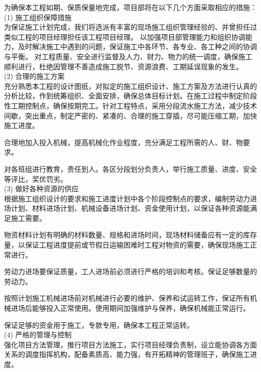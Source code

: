 为确保本工程如期、保质保量地完成，项目部将在以下几个方面采取相应的措施：\\

(1) 施工组织保障措施\\

为保证施工计划完成，我们将选派有丰富的现场施工组织管理经验的、并曾担任过类似工程的项目经理担任该工程项目经理。
以加强项目部管理能力和组织协调能力，及时解决施工中遇到的问题，保证施工中各环节、各专业、各工种之间的协调与平衡。
对工程质量、安全进行监督及人力、财力、物力的统一调度，确保施工顺利进行，杜绝因管理不善造成施工脱节、资源浪费、工期延误现象的发生。\\

(2) 合理的施工方案\\

 充分熟悉本工程的设计图纸，对拟定的施工组织设计、施工方案及方法进行认真的分析比较，作到统筹组织、全面安排，确保总体目标计划。在施工过程中制定阶段性工期控制点，确保按期完工。针对工程特点，采用分段流水施工方法，减少技术间歇，突出重点，制定严密的、紧凑的、合理的施工穿插，尽可能压缩工期，加快施工进度。

 合理地加入投入机械，提高机械化作业程度，充分满足工程所需的人、财、物要求。

 对各班组进行教育，责任到人。各区分段划分负责人，举行施工质量、进度、安全等评比，奖优罚劣。\\

(3) 做好各种资源的供应\\

 根据施工组织设计的要求和施工进度计划中各个阶段控制点的要求，编制劳动力进场计划、材料进场计划、机械设备进场计划、资金使用计划，以保证各种资源能满足施工需要。

 物资材料计划有明确的材料数量、规格和进场时间，现场材料储备应有一定的库存量，以保证工程进度提前或节假日运输困难时工程对物资的需要，确保现场施工正常进行。

 劳动力进场要保证质量，工人进场前必须进行严格的培训和考核。保证足够数量的劳动力。

 按照计划施工机械进场前对机械进行必要的维护、保养和试运转工作，保证所有机械进场后能够投入正常使用。使用期间加强维护与保养，确保机械能正常运行。

 保证足够的资金用于施工，专款专用，确保本工程正常运转。\\

(4) 严格的管理与控制\\

 强化项目方法管理，推行项目方法施工，实行项目经理负责制，设立能协调各方面关系的调度指挥机构，配备素质高、能力强，有开拓精神的管理班子，确保施工进度。

